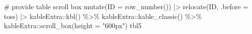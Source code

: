 \documentclass[
  letterpaper,
  DIV=11,
  numbers=noendperiod]{scrreprt}
\newenvironment{Shaded}{\begin{snugshade}}{\end{snugshade}}
\newcommand{\AttributeTok}[1]{\textcolor[rgb]{0.40,0.45,0.13}{#1}}
\newcommand{\CommentTok}[1]{\textcolor[rgb]{0.37,0.37,0.37}{#1}}
\newcommand{\FunctionTok}[1]{\textcolor[rgb]{0.28,0.35,0.67}{#1}}
\newcommand{\InformationTok}[1]{\textcolor[rgb]{0.37,0.37,0.37}{#1}}
\newcommand{\NormalTok}[1]{\textcolor[rgb]{0.00,0.23,0.31}{#1}}
\newcommand{\SpecialCharTok}[1]{\textcolor[rgb]{0.37,0.37,0.37}{#1}}
\newcommand{\StringTok}[1]{\textcolor[rgb]{0.13,0.47,0.30}{#1}}
\begin{document}
\begin{Shaded}
\begin{Highlighting}[]
  \CommentTok{\# provide table scroll box}
  \FunctionTok{mutate}\NormalTok{(}\AttributeTok{ID =} \FunctionTok{row\_number}\NormalTok{()) }\SpecialCharTok{|\textgreater{}} 
  \FunctionTok{relocate}\NormalTok{(ID, }\AttributeTok{.before =}\NormalTok{ toss) }\SpecialCharTok{|\textgreater{}} 
\NormalTok{  kableExtra}\SpecialCharTok{::}\FunctionTok{kbl}\NormalTok{() }\SpecialCharTok{\%\textgreater{}\%}
\NormalTok{  kableExtra}\SpecialCharTok{::}\FunctionTok{kable\_classic}\NormalTok{() }\SpecialCharTok{\%\textgreater{}\%}
\NormalTok{  kableExtra}\SpecialCharTok{::}\FunctionTok{scroll\_box}\NormalTok{(}\AttributeTok{height =} \StringTok{"600px"}\NormalTok{)}
\NormalTok{tbl5}
\InformationTok{\textasciigrave{}\textasciigrave{}\textasciigrave{}}
\end{Highlighting}
\end{Shaded}
\end{document}
